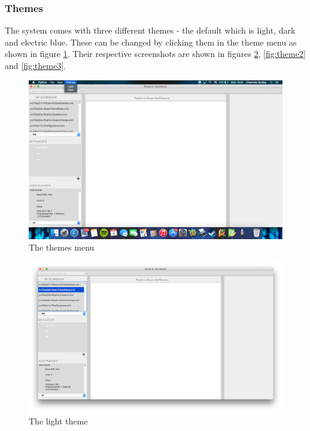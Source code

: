 \subsubsection{Themes}
The system comes with three different themes - the default which is light, dark and electric blue. These can be changed by clicking them in the theme menu as shown in figure \ref{fig:themes}. Their respective screenshots are shown in figures \ref{fig:theme1}, \ref{fig:theme2} and \ref{fig:theme3}.
\begin{figure}[H]
\centering
\includegraphics[width=500pt]{theme}
\caption{The themes menu}
\label{fig:themes}	
\end{figure}

\begin{figure}[H]
\centering
\includegraphics[width=400pt]{main_screenshot}
\caption{The light theme}
\label{fig:theme1}	
\end{figure}

